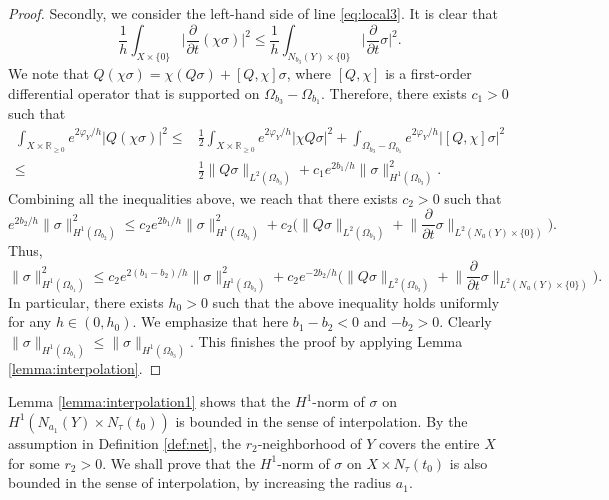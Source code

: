 \documentclass[12pt, reqno]{amsart}
\theoremstyle{plain}%
\theoremstyle{definition}
\theoremstyle{remark}
\numberwithin{equation}{section}
\newcommand{\R}{\mathbb{R}}
\begin{document}
\begin{proof}
	Secondly,  we consider the left-hand side of line \eqref{eq:local3}. It is clear that
	\begin{equation*}
		\frac{1}{h}\int_{X\times\{0\}}\Big|\frac{\partial}{\partial t}(\chi\sigma)\Big|^2\leq \frac{1}{h}\int_{N_{b_3}(Y)\times\{0\}}\Big|\frac{\partial}{\partial t}\sigma\Big|^2.
	\end{equation*}
	We note that $Q(\chi\sigma)=\chi(Q\sigma)+[Q,\chi]\sigma$, where $[Q,\chi]$ is a first-order differential operator that is supported on $\Omega_{b_3}-\Omega_{b_1}$. Therefore, there exists $c_1>0$ such that
	\begin{equation*}
		\begin{split}
			\int_{X\times\R_{\geq 0}}e^{2\varphi_Y/h}|Q(\chi\sigma)|^2\leq& \frac 1 2\int_{X\times\R_{\geq 0}}e^{2\varphi_Y/h}|\chi Q\sigma|^2+\int_{\Omega_{b_3}-\Omega_{{b_1}}}e^{2\varphi_Y/h}|[Q,\chi]\sigma|^2\\
			\leq &\frac1 2\|Q\sigma\|_{L^2(\Omega_{b_3})}+c_1e^{2{b_1}/h}\|\sigma\|^2_{H^1(\Omega_{b_3})}.
		\end{split}
	\end{equation*}
	Combining all the inequalities above, we reach that there exists $c_2>0$ such that
	\begin{equation*}
		e^{2b_2/h}\|\sigma\|_{H^1(\Omega_{b_2})}^2\leq c_2e^{2{b_1}/h}\|\sigma\|_{H^1(\Omega_{b_3})}^2+c_2\Big(\|Q\sigma\|_{L^2(\Omega_{b_3})}+\Big\|\frac{\partial}{\partial t}\sigma\Big\|_{L^2(N_a(Y)\times\{0\})}\Big).
	\end{equation*}
	Thus,
		\begin{equation*}
		\|\sigma\|_{H^1(\Omega_{{b_1}})}^2\leq c_2e^{2({b_1}-b_2)/h}\|\sigma\|_{H^1(\Omega_{b_3})}^2+c_2e^{-2b_2/h}\Big(\|Q\sigma\|_{L^2(\Omega_{b_3})}+\Big\|\frac{\partial}{\partial t}\sigma\Big\|_{L^2(N_a(Y)\times\{0\})}\Big).
	\end{equation*}
	In particular, there exists $h_0>0$ such that the above inequality holds uniformly for any $h\in(0,h_0)$. We emphasize that here ${b_1}-b_2<0$ and $-b_2>0$. Clearly $\|\sigma\|_{H^1(\Omega_{{b_1}})}\leq \|\sigma\|_{H^1(\Omega_{{b_3}})}$. This finishes the proof by applying Lemma \ref{lemma:interpolation}.
\end{proof}

Lemma \ref{lemma:interpolation1} shows that the $H^1$-norm of $\sigma$ on $H^1(N_{a_1}(Y)\times N_\tau(t_0))$ is bounded in the sense of interpolation. By the assumption in Definition \ref{def:net}, the $r_2$-neighborhood of $Y$ covers the entire $X$ for some $r_2>0$. We shall prove that the $H^1$-norm of $\sigma$ on $X\times N_\tau(t_0)$ is also bounded in the sense of interpolation, by increasing the radius $a_1$.
\end{document}
